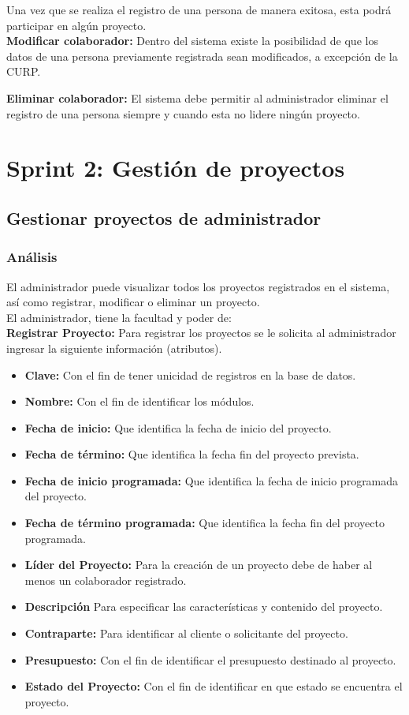 Una vez que se realiza el registro de una persona de manera exitosa, esta podrá participar en algún proyecto.\\

\textbf {Modificar colaborador:} Dentro del sistema existe la posibilidad de que los datos de una persona previamente registrada sean modificados, a excepción de la CURP.

\textbf {Eliminar colaborador:} El sistema debe permitir al administrador eliminar el registro de una persona siempre y cuando esta no lidere ningún proyecto.

\section{Sprint 2: Gestión de proyectos}
\subsection{Gestionar proyectos de administrador}
\subsubsection {Análisis}
El administrador puede visualizar todos los proyectos registrados en el sistema, así como registrar, modificar o eliminar un proyecto.\\

El administrador, tiene la facultad y poder de:\\

\textbf {Registrar Proyecto:}
Para registrar los proyectos se le solicita al administrador ingresar la siguiente información (atributos).

\begin{itemize}
	\item \textbf{Clave:} Con el fin de tener unicidad de registros en la base de datos.
	\item \textbf{Nombre:} Con el fin de identificar los módulos.
	\item \textbf{Fecha de inicio:} Que identifica la fecha de inicio del proyecto.
	\item \textbf{Fecha de término:} Que identifica la fecha fin del proyecto prevista.
	\item \textbf{Fecha de inicio programada:} Que identifica la fecha de inicio programada del proyecto.
	\item \textbf{Fecha de término programada:} Que identifica la fecha fin del proyecto programada.
	\item \textbf{Líder del Proyecto:} Para la creación de un proyecto debe de haber al menos un colaborador registrado.
	\item \textbf{Descripción} Para especificar las características y contenido del proyecto.
	\item \textbf{Contraparte:} Para identificar al cliente o solicitante del proyecto.
	\item \textbf{Presupuesto:} Con el fin de identificar el presupuesto destinado al proyecto.
	\item \textbf{Estado del Proyecto:} Con el fin de identificar en que estado se encuentra el proyecto.
\end{itemize}

